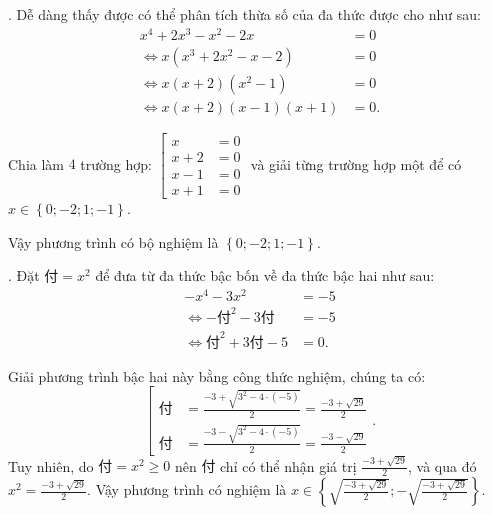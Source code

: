 . Dễ dàng thấy được có thể phân tích thừa số của đa thức được cho như sau:
\begin{align*}
   x^4 + 2x^3 - x^2 -2x &= 0 \\
   \iff x(x^3 + 2x^2 - x - 2) &= 0 \\
   \iff x(x + 2)(x^2 - 1) &= 0 \\
   \iff x(x + 2)(x - 1)(x + 1) &= 0.
\end{align*}

Chia làm $4$ trường hợp: $\left[
   \begin{aligned}
      x &= 0 \\
      x + 2&= 0 \\
      x - 1 &= 0 \\
      x + 1 &= 0
   \end{aligned}
\right.$ và giải từng trường hợp một để có $x \in \left\{0; -2; 1; -1\right\}$.

Vậy phương trình có bộ nghiệm là $\displaystyle\left\{0; -2; 1; -1\right\}$.

\def\varPhu {\textit{付}}

. Đặt $\varPhu = x^2$ để đưa từ đa thức bậc bốn về đa thức bậc hai như sau:
\begin{align*}
   -x^4 - 3x^2 &= -5 \\
   \iff -\varPhu^2 - 3\varPhu &= -5 \\
   \iff \varPhu^2 + 3\varPhu - 5 &= 0.
\end{align*}

Giải phương trình bậc hai này bằng công thức nghiệm, chúng ta có:
$$
\left[
   \begin{aligned}
      \varPhu &= \frac{-3 + \sqrt{3^2 - 4 \cdot (-5)}}{2} = \frac{-3 + \sqrt{29}}{2} \\
      \varPhu &= \frac{-3 - \sqrt{3^2 - 4 \cdot (-5)}}{2} = \frac{-3 - \sqrt{29}}{2}
   \end{aligned}
\right..
$$ Tuy nhiên, do $\varPhu = x^2 \geq 0$ nên $\varPhu$ chỉ có thể nhận giá trị $\frac{-3 + \sqrt{29}}{2}$, và qua đó $x^2 = \frac{-3 + \sqrt{29}}{2}$. Vậy phương trình có nghiệm là $x \in \left\{\sqrt{\frac{-3 + \sqrt{29}}{2}}; -\sqrt{\frac{-3 + \sqrt{29}}{2}}\right\}$.

